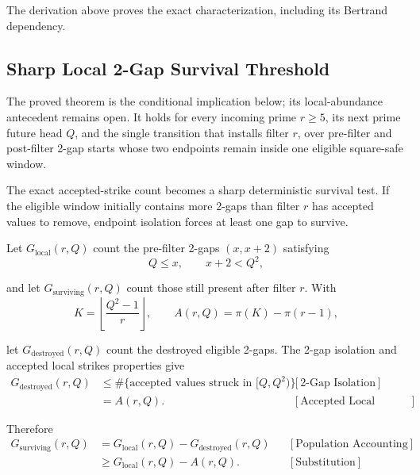 {\raggedright
The derivation above proves the exact characterization, including its Bertrand
dependency. \par}

\subsection{Sharp Local 2-Gap Survival Threshold}
\label{sec:sharp-local-survival-threshold}

The proved theorem is the conditional implication below; its local-abundance
antecedent remains open. It holds for every incoming prime $r\ge5$, its next
prime future head $Q$, and the single transition that installs filter $r$,
over pre-filter and post-filter 2-gap starts whose two endpoints remain
inside one eligible square-safe window.

The exact accepted-strike count becomes a sharp deterministic survival test.
If the eligible window initially contains more 2-gaps than filter $r$ has
accepted values to remove, endpoint isolation forces at least one gap to
survive.

Let $G_{\mathrm{local}}(r,Q)$ count the pre-filter 2-gaps $(x,x+2)$ satisfying
\begin{equation*}
Q\le x,
\qquad
x+2\lt Q^2,
\end{equation*}

and let $G_{\mathrm{surviving}}(r,Q)$ count those still present after filter
$r$. With
\begin{equation*}
K=\left\lfloor\frac{Q^2-1}{r}\right\rfloor,
\qquad
A(r,Q)=\pi(K)-\pi(r-1),
\end{equation*}

let $G_{\mathrm{destroyed}}(r,Q)$ count the destroyed eligible 2-gaps. The
2-gap isolation and accepted local strikes properties give
\begin{equation*}
\begin{aligned}
G_{\mathrm{destroyed}}(r,Q)
&\le\#\{\text{accepted values struck in }[Q,Q^2)\}
&&[\text{2-Gap Isolation}]\\
&=A(r,Q).
&&[\text{Accepted Local Strikes}]
\end{aligned}
\end{equation*}

Therefore
\begin{equation*}
\begin{aligned}
G_{\mathrm{surviving}}(r,Q)
&=G_{\mathrm{local}}(r,Q)
  -G_{\mathrm{destroyed}}(r,Q)
&&[\text{Population Accounting}]\\
&\ge G_{\mathrm{local}}(r,Q)-A(r,Q).
&&[\text{Substitution}]
\end{aligned}
\end{equation*}

